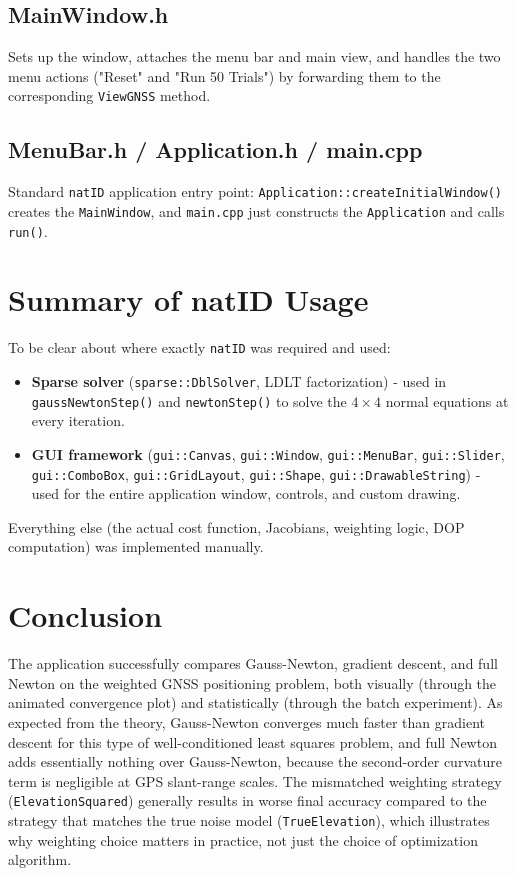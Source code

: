 \documentclass[11pt]{article}
\begin{document}
\subsection{MainWindow.h}

Sets up the window, attaches the menu bar and main view, and handles the two menu actions ("Reset" and "Run 50 Trials") by forwarding them to the corresponding \texttt{ViewGNSS} method.

\subsection{MenuBar.h / Application.h / main.cpp}

Standard \texttt{natID} application entry point: \texttt{Application::createInitialWindow()} creates the \texttt{MainWindow}, and \texttt{main.cpp} just constructs the \texttt{Application} and calls \texttt{run()}.

\section{Summary of natID Usage}

To be clear about where exactly \texttt{natID} was required and used:

\begin{itemize}
    \item \textbf{Sparse solver} (\texttt{sparse::DblSolver}, LDLT factorization) - used in \texttt{gaussNewtonStep()} and \texttt{newtonStep()} to solve the $4\times4$ normal equations at every iteration.
    \item \textbf{GUI framework} (\texttt{gui::Canvas}, \texttt{gui::Window}, \texttt{gui::MenuBar}, \texttt{gui::Slider}, \texttt{gui::ComboBox}, \texttt{gui::GridLayout}, \texttt{gui::Shape}, \texttt{gui::DrawableString}) - used for the entire application window, controls, and custom drawing.
\end{itemize}

Everything else (the actual cost function, Jacobians, weighting logic, DOP computation) was implemented manually.

\section{Conclusion}

The application successfully compares Gauss-Newton, gradient descent, and full Newton on the weighted GNSS positioning problem, both visually (through the animated convergence plot) and statistically (through the batch experiment). As expected from the theory, Gauss-Newton converges much faster than gradient descent for this type of well-conditioned least squares problem, and full Newton adds essentially nothing over Gauss-Newton, because the second-order curvature term is negligible at GPS slant-range scales. The mismatched weighting strategy (\texttt{ElevationSquared}) generally results in worse final accuracy compared to the strategy that matches the true noise model (\texttt{TrueElevation}), which illustrates why weighting choice matters in practice, not just the choice of optimization algorithm.
\end{document}
